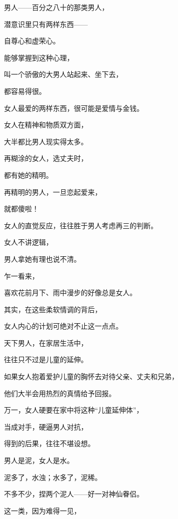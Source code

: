 \par 男人——百分之八十的那类男人，
\par 潜意识里只有两样东西——
\par 自尊心和虚荣心。
\par 能够掌握到这种心理，
\par 叫一个骄傲的大男人站起来、坐下去，
\par 都容易得很。
\par 
\par 女人最爱的两样东西，很可能是爱情与金钱。
\par 女人在精神和物质双方面，
\par 大半都比男人现实得太多。
\par 
\par 再糊涂的女人，选丈夫时，
\par 都有她的精明。
\par 再精明的男人，一旦恋起爱来，
\par 就都傻啦！
\par 
\par 女人的直觉反应，往往胜于男人考虑再三的判断。
\par 女人不讲逻辑，
\par 男人拿她有理也说不清。
\par 
\par 乍一看来，
\par 喜欢花前月下、雨中漫步的好像总是女人。
\par 其实，在这些柔软情调的背后，
\par 女人内心的计划可绝对不止这一点点。
\par 
\par 天下男人，在家居生活中，
\par 往往只不过是儿童的延伸。
\par 如果女人抱着爱护儿童的胸怀去对待父亲、丈夫和兄弟，
\par 他们大半会用热烈的真情给予回报。
\par 
\par 万一，女人硬要在家中将这种“儿童延伸体”，
\par 当成对手，硬逼男人对抗，
\par 得到的后果，往往不堪设想。
\par 
\par 男人是泥，女人是水。
\par 泥多了，水浊；水多了，泥稀。
\par 
\par 不多不少，捏两个泥人——好一对神仙眷侣。
\par 这一类，因为难得一见，
